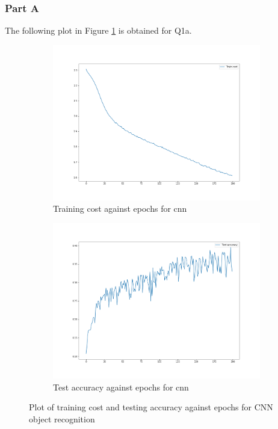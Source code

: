 \subsubsection{Part A}
The following plot in Figure \ref{fig:1a} is obtained for Q1a.
\begin{figure}[H]
    \begin{subfigure}{1\textwidth}
        \centering
        \includegraphics[width=0.8\linewidth]{assets/plots1/q1a_1.png}
        \caption{Training cost against epochs for cnn}
    \end{subfigure}
    \begin{subfigure}{1\textwidth}
        \centering
        \includegraphics[width=0.8\linewidth]{assets/plots1/q1a_2.png}
        \caption{Test accuracy against epochs for cnn}
    \end{subfigure}
    \caption{Plot of training cost and testing accuracy against epochs for CNN object recognition}
    \label{fig:1a}
\end{figure}


